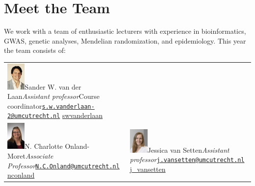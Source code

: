 \documentclass[
]{book}
\begin{document}
\hypertarget{meet-the-team}{%
\section{Meet the Team}\label{meet-the-team}}

We work with a team of enthusiastic lecturers with experience in bioinformatics, GWAS, genetic analyses, Mendelian randomization, and epidemiology. This year the team consists of:

\begin{longtable}[]{@{}
  >{\raggedright\arraybackslash}p{}
  >{\raggedright\arraybackslash}p{}@{}}
\toprule
\endhead
\includegraphics[width=0.15\textwidth,height=\textheight]{img/sander_vander_laan.jpg}Sander W. van der Laan\emph{Assistant professor}Course coordinator\href{mailto:s.w.vanderlaan-2@umcutrecht.nl}{\nolinkurl{s.w.vanderlaan-2@umcutrecht.nl}} \textbar{} \href{http://www.twitter.com/swvanderlaan}{swvanderlaan} & \\
\includegraphics[width=0.15\textwidth,height=\textheight]{img/charlotte_onland.jpg}N. Charlotte Onland-Moret\emph{Associate Professor}\href{mailto:N.C.Onland@umcutrecht.nl}{\nolinkurl{N.C.Onland@umcutrecht.nl}} \textbar{} \href{http://www.twitter.com/nconland}{nconland} & \includegraphics[width=0.15\textwidth,height=\textheight]{img/jessica_van_setten.jpg}Jessica van Setten\emph{Assistant professor}\href{mailto:j.vansetten@umcutrecht.nl}{\nolinkurl{j.vansetten@umcutrecht.nl}} \textbar{} \href{http://www.twitter.com/j_vansetten}{j\_vansetten} \\

\end{longtable}
\end{document}
